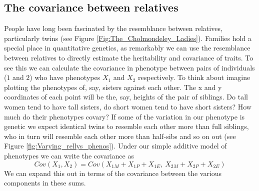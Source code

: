  
\subsection{The covariance between relatives}
People have long been fascinated by the resemblance between relatives,
particularly twins (see Figure
\ref{Fig:The_Cholmondeley_Ladies}). Families hold a special place in
quantitative genetics, as remarkably we can use the
resemblance between relatives to directly estimate the heritability
and covariance of traits. To see this we can calculate the covariance
in phenotype between pairs of individuals
($1$ and $2$) who have phenotypes $X_1$ and $X_2$
respectively. To
think about imagine plotting the phenotypes of, say, sisters against
each other. The x and y coordinates of each point will be the, say,
heights of the pair of siblings. Do tall women tend to have tall
sisters, do short women tend to have short sisters? How much do their
phenotypes covary? If some of the variation in our phenotype is
genetic we expect identical twins to resemble each other more than
full siblings, who in turn will resemble each other more than
half-sibs and so on out (see Figure \ref{fig:Varying_rellys_phenos}). Under our simple additive model of phenotypes we
can write the covariance as 
\begin{equation}
Cov(X_1,X_2) =
Cov\left( X_{1M}+X_{1P}+X_{1E},~ X_{2M}+X_{2P}+X_{2E} \right)
\end{equation}
We can expand this out in terms of the covariance between the various
components in these sums.\\


